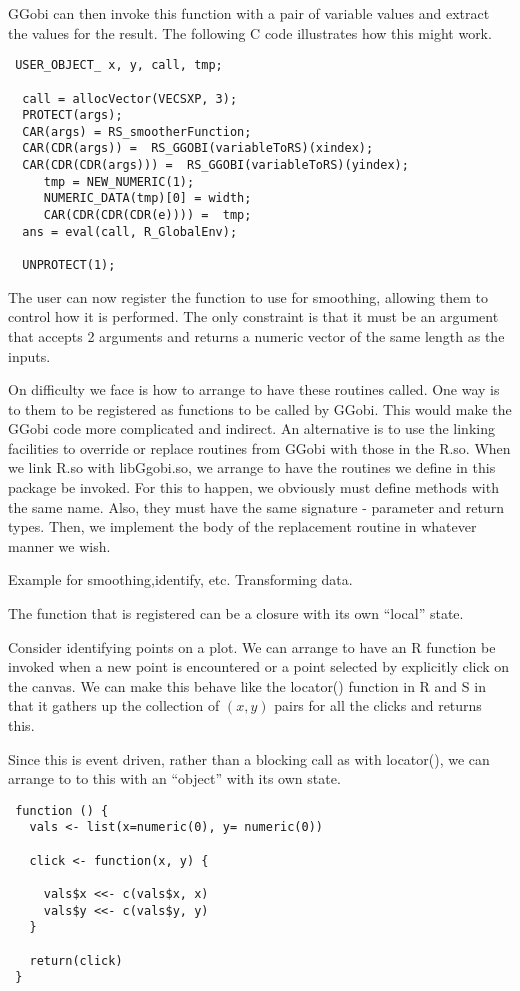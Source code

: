 \documentclass{article}
\begin{document}
GGobi can then invoke this function with a pair of variable values and
extract the values for the result.
The following C code illustrates how this might work.
\begin{verbatim}
 USER_OBJECT_ x, y, call, tmp;

  call = allocVector(VECSXP, 3);
  PROTECT(args);
  CAR(args) = RS_smootherFunction;
  CAR(CDR(args)) =  RS_GGOBI(variableToRS)(xindex);
  CAR(CDR(CDR(args))) =  RS_GGOBI(variableToRS)(yindex);
     tmp = NEW_NUMERIC(1);
     NUMERIC_DATA(tmp)[0] = width;
     CAR(CDR(CDR(CDR(e)))) =  tmp;
  ans = eval(call, R_GlobalEnv);

  UNPROTECT(1);
\end{verbatim}

The user can now register the function to use for smoothing, allowing
them to control how it is performed. The only constraint is that it
must be an argument that accepts 2 arguments and returns a numeric
vector of the same length as the inputs.



On difficulty we face is how to arrange to have these routines called.
One way is to them to be registered as functions to be called by
GGobi. This would make the GGobi code more complicated and indirect.
An alternative is to use the linking facilities to override or replace
routines from GGobi with those in the R.so.  When we link R.so with
libGgobi.so, we arrange to have the routines we define in this package
be invoked.  For this to happen, we obviously must define methods with
the same name. Also, they must have the same signature - parameter and
return types. Then, we implement the body of the replacement
routine in whatever manner we wish.





Example for smoothing,identify, etc.
Transforming data.



The function that is registered can be a closure
with its own ``local'' state.


Consider identifying points on a plot.  We can arrange to have an R
function be invoked when a new point is encountered or a point
selected by explicitly click on the canvas.
We can make this behave like the locator() function
in R and S in that it gathers up the collection of 
$(x, y)$ pairs for all the clicks
and returns this.

Since this is event driven, rather than a blocking call as with
locator(), we can arrange to to this with an ``object'' with its own
state.
\begin{verbatim}
 function () {
   vals <- list(x=numeric(0), y= numeric(0))

   click <- function(x, y) {
    
     vals$x <<- c(vals$x, x)
     vals$y <<- c(vals$y, y)
   }

   return(click)
 }
\end{verbatim}
\end{document}
